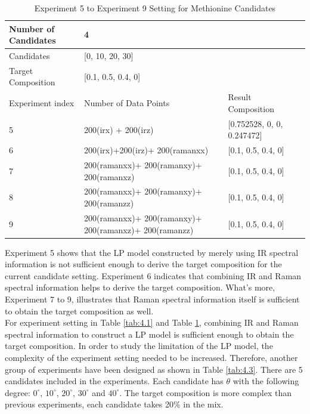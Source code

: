 \begin{table}\tiny 
\begin{tabular}{| l | l | l | l }
\hline
Number of Candidates & \multicolumn{2}{l|}{4} \\ \hline
Candidates & \multicolumn{2}{l|}{[0, 10, 20, 30]} \\ \hline
Target Composition & \multicolumn{2}{l|}{[0.1, 0.5, 0.4, 0]} \\ \hline
Experiment index & Number of Data Points & Result Composition \\ \hline
5 & 200(irx) + 200(irz) & [0.752528, 0, 0, 0.247472]  \\ \hline
6 & 200(irx)+200(irz)+ 200(ramanxx) & [0.1, 0.5, 0.4, 0] \\ \hline
7 & 200(ramanxx)+ 200(ramanxy)+ 200(ramanxz) & [0.1, 0.5, 0.4, 0] \\ \hline
8 & 200(ramanxx)+ 200(ramanxy)+ 200(ramanzz) & [0.1, 0.5, 0.4, 0] \\ \hline
9 & 200(ramanxx)+ 200(ramanxy)+ 200(ramanxz)+ 200(ramanzz)   & [0.1, 0.5, 0.4, 0] \\ \hline
\end{tabular} 
\caption{Experiment 5 to Experiment 9 Setting for Methionine Candidates}
\label{tab:4.2}
\end{table}	

Experiment 5 shows that the LP model constructed by merely using IR spectral information is not sufficient enough to derive the target composition for the current candidate setting. Experiment 6 indicates that combining IR and Raman spectral information helps to derive the target composition. What's more, Experiment  7 to 9, illustrates that Raman spectral information itself is sufficient to obtain the target composition as well. \\

For experiment setting in Table \ref{tab:4.1} and Table \ref{tab:4.2}, combining IR and Raman spectral information to construct a LP model is sufficient enough to obtain the target composition. In order to study the limitation of the LP model, the complexity of the experiment setting needed to be increased. Therefore, another group of experiments have been designed as shown in Table \ref{tab:4.3}. There are 5 candidates included in the experiments. Each candidate has $\theta$ with the following degree: $0^{\circ}$, $10^{\circ}$, $20^{\circ}$, $30^{\circ}$ and $40^{\circ}$. The target composition is more complex than previous experiments, each candidate takes 20\% in the mix. \\

